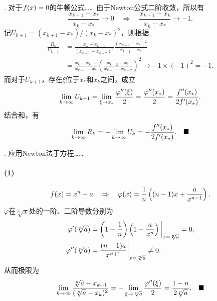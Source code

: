 \vspace{1cm}
\par{}. 对于$\mathnormal{f}(x)=0$的牛顿公式……
\proof
  由于Newton公式二阶收敛，所以有
  \begin{equation}
    \label{sim}
    \frac{x_{k+1}-x_*}{x_k-x_*} \to 0 \quad\Rightarrow\quad
    \frac{x_{k+1}-x_k}{x_k-x_*} \to -1.
  \end{equation}
  记$U_{k+1} = (x_{k+1}-x_*)/(x_k-x_*)^2$，则根据
  \begin{equation}
    \label{RU}
    \begin{split}
    \frac{R_k}{U_{k-1}} &= \frac{x_k-x_{k-1}}{(x_{k-1}-x_{k-2})^2}
    \frac{(x_{k-2}-x_*)^2}{x_{k-1}-x_*} \\
    & = \frac{x_k-x_{k-1}}{x_{k-1}-x_*}\left(
      \frac{x_{k-2} - x_*}{x_{k-1} - x_{k-2}}
    \right)^2 \to -1\times(-1)^2 = -1.
  \end{split}\end{equation}
  而对于$U_{k+1}$，存在$\xi$位于$x_*$和$x_k$之间，成立
  \begin{equation}
    \label{lim}
    \lim_{k\to\infty} U_{k+1} = \lim_{\xi\to x_*}\frac{\varphi^{\prime\prime}(\xi)}{2}
    = \frac{\varphi^{\prime\prime}(x_*)}{2} = \frac{\mathnormal{f}^{\prime\prime}(x_*)}{2\mathnormal{f}^{\prime}(x_*)}.
  \end{equation}
  结合和，有
  \[
    \lim_{k\to\infty}R_k = -\lim_{k\to\infty}U_k = -\frac{\mathnormal{f}^{\prime\prime}(x_*)}{2\mathnormal{f}^{\prime}(x_*)}.
    \quad\blacksquare
  \]

\vspace{1cm}
\par{}. 应用Newton法于方程……
\ans
\paragraph{(1)}
  \[
    \mathnormal{f}(x) = x^n - a \quad\Rightarrow\quad
    \varphi(x) = \frac{1}{n}\left( (n-1)x + \frac{a}{x^{n-1}} \right).
  \]
  $\varphi$在$\sqrt[n]{x}$处的一阶、二阶导数分别为
  \[\begin{split}
    \varphi^{\prime}(\sqrt[n]{a}) &= \left(1-\frac{1}{n}\right)\left(1-\frac{a}{x^n}\right)
    \bigg|_{x=\sqrt[n]{a}} = 0, \\
    \varphi^{\prime\prime}(\sqrt[n]{a}) &= \frac{(n-1)a}{x^{n+1}}\bigg|_{x=\sqrt[n]{a}} \ne 0.
  \end{split}\]
  从而极限为
  \[
    \lim_{k\to\infty}\frac{\sqrt[n]{a} - x_{k+1}}{(\sqrt[n]{a}-x_k)^2}
    = -\lim_{\xi\to\sqrt[n]{a}}\frac{\varphi^{\prime\prime}(\xi)}{2}
    = \frac{1-n}{2\sqrt[n]{a}}.\quad\blacksquare
  \]
